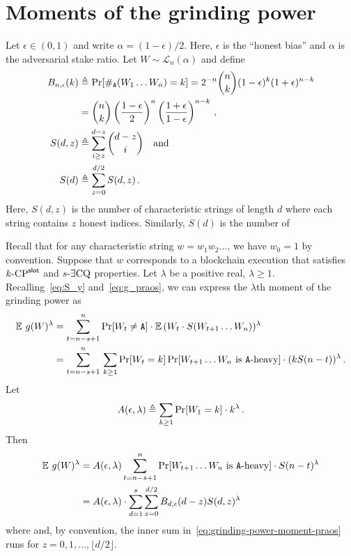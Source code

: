\section{Moments of the grinding power}\label{sec:praos-gp-mgf}
Let $\epsilon \in (0, 1)$ and write $\alpha = (1 - \epsilon)/2$. 
Here, $\epsilon$ is the ``honest bias'' and $\alpha$ is the adversarial stake ratio.
Let $W \sim \mathcal{L}_n(\alpha)$ and 
define 
\begin{align}
    B_{n, \epsilon}(k) 
    &\triangleq \Pr[ \#_{\mathtt{A}}(W_1 \ldots W_n) = k ]  
    = 2^{-n}\binom{n}{k} (1-\epsilon)^k (1 + \epsilon)^{n-k} \nonumber\\
    &=  \binom{n}{k} 
        \left(\frac{1-\epsilon}{2}\right)^n 
        \left(\frac{1 + \epsilon}{1-\epsilon} \right)^{n-k} 
        \,, \label{eq:suffix-prob-binomial}\\
  S(d, z) 
    &\triangleq \sum_{i \geq z}^{d-z}{ \binom{d-z}{i} } \label{eq:S_d_z}
    \quad\text{and}\quad \\
  S(d) &\triangleq \sum_{z = 0}^{d/2} S(d,z) \label{eq:S_d}
  \,.
\end{align}
Here, $S(d,z)$ is the number of characteristic strings 
of length $d$ where each string contains $z$ honest indices. 
Similarly, $S(d)$ is the number of 



Recall that for any characteristic string $w = w_1 w_2 \ldots$, 
we have $w_0 = 1$ by convention. 
Suppose that $w$ corresponds to a blockchain execution that 
satisfies ${k}\text{-}\mathrm{CP}^{\mathsf{slot}}$ and ${s}\text{-}\exists\mathrm{CQ}$ properties.
Let $\lambda$ be a positive real, $\lambda \geq 1$. 
Recalling~\eqref{eq:S_y} and~\eqref{eq:g_praos}, 
we can express the $\lambda$th moment of the grinding power as
\begin{align}
    \operatorname{\mathbb{E}}\, g(W)^\lambda 
    &= \sum_{t = n-s+1}^n \Pr[W_t \neq \mathtt{A}] \cdot \operatorname{\mathbb{E}}\, (W_t \cdot S(W_{t+1}\ldots W_n))^\lambda \nonumber \\
    &= \sum_{t = n-s+1}^n\,
    \sum_{k \geq 1} 
      \Pr[W_{t} = k] \Pr[\text{$W_{t+1}\ldots W_n$ is $\mathtt{A}\text{-heavy}$}]\cdot (k S(n - t) )^\lambda \nonumber\,.
\end{align}
Let
\begin{equation}
  A(\epsilon, \lambda) \triangleq \sum_{k\geq 1} \Pr[W_1 = k] \cdot k^\lambda
  \,.
  \label{eq:A}
\end{equation}
Then
\begin{align}
    \Exp\, g(W)^\lambda 
    &= A(\epsilon, \lambda) 
      \sum_{t = n-s+1}^n 
      \Pr[\text{$W_{t+1}\ldots W_n$ is $\Aheavy$}]\cdot S(n-t)^\lambda \nonumber \\
    &=  %
        A(\epsilon, \lambda)
        \cdot 
        \sum_{d=1}^s \sum_{z = 0}^{ d/2 } B_{d, \epsilon}(d - z) S(d,z)^\lambda \label{eq:grinding-power-moment-praos}
\end{align}
where 
and, by convention, 
the inner sum in~\eqref{eq:grinding-power-moment-praos} 
runs for $z = 0, 1, \ldots, \lfloor d/2 \rfloor$.




